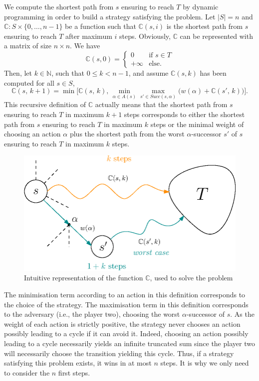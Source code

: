 We compute the shortest path from $s$ ensuring to reach $T$ by dynamic programming in order to build a strategy satisfying the \SPG{} problem.
Let $|S| = n$ and $\mathbb{C}: S \times \{0, \dots, n-1 \}$ be a function such that $\mathbb{C}(s, i)$ is the shortest path from $s$ ensuring to reach $T$ after maximum
$i$ steps.
Obviously, $\mathbb{C}$ can be represented with a matrix of size $n \times n$.
We have \[\mathbb{C}(s, 0) = \begin{cases}
  0 & \text{if } s \in T\\
  +\infty & \text{else}.
\end{cases}\]
Then, let $k \in \mathbb{N}$, such that $0 \leq k < n - 1$, and assume $\mathbb{C}(s, k)$ has been computed for all $s \in S$,
\[
  \mathbb{C}(s,\, k+1) = \min \big[\mathbb{C}(s,\, k),\, \min_{\alpha \in A(s)} \max_{s' \in Succ(s,\alpha)} \big(w(\alpha) + \mathbb{C}(s',\, k)\big)\big].
\]
This recursive definition of $\mathbb{C}$ actually means that the shortest path from $s$ ensuring to reach $T$ in maximum $k+1$ steps corresponds to either the shortest path from $s$ ensuring to reach $T$ in maximum $k$ steps or the minimal weight of choosing an action $\alpha$ plus the shortest path from the worst $\alpha$-successor $s'$ of $s$ ensuring to reach $T$ in maximum $k$ steps.
\begin{figure}[h]
  \centering
  \includegraphics[width=0.6\linewidth]{resources/sp-g}
  \captionsetup{justification=centering}
  \caption{Intuitive representation of  the function $\mathbb{C}$, used to solve the \SPG{} problem}
\end{figure}
The minimisation term according to an action in this definition corresponds to the choice of the strategy.
The maximisation term in this definition corresponds to the adversary (i.e., the player two), choosing the worst $\alpha$-successor of $s$.
As the weight of each action is strictly positive, the strategy never chooses an action possibly leading to a  cycle if it can avoid it.
Indeed, choosing an action possibly leading to a cycle necessarily yields an infinite truncated sum since the player two will necessarily choose the transition yielding this cycle.
Thus, if a strategy satisfying this problem exists, it wins in at most $n$ steps. It is why we only need to consider the $n$ first steps.

